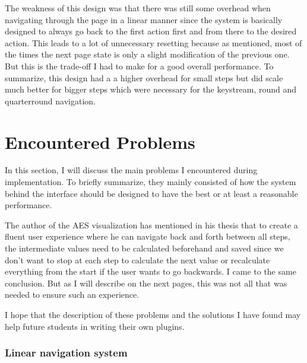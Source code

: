 The weakness of this design was that there was still some overhead when navigating through the page in a linear manner since the system is basically designed to always go back to the first action first and from there to the desired action. This leads to a lot of unnecessary resetting because as mentioned, most of the times the next page state is only a slight modification of the previous one. But this is the trade-off I had to make for a good overall performance. To summarize, this design had a a higher overhead for small steps but did scale much better for bigger steps which were necessary for the keystream, round and quarterround navigation. 


\section{Encountered Problems}
\label{sec:encounteredProblems}

In this section, I will discuss the main problems I encountered during implementation. To briefly summarize, they mainly consisted of how the system behind the interface should be designed to have the best or at least a reasonable performance.

The author of the AES visualization has mentioned in his thesis that to create a fluent user experience where he can navigate back and forth between all steps, the intermediate values need to be calculated beforehand and saved since we don't want to stop at each step to calculate the next value or recalculate everything from the start if the user wants to go backwards. I came to the same conclusion. But as I will describe on the next pages, this was not all that was needed to ensure such an experience.

I hope that the description of these problems and the solutions I have found may help future students in writing their own plugins.

\subsubsection{Linear navigation system}

